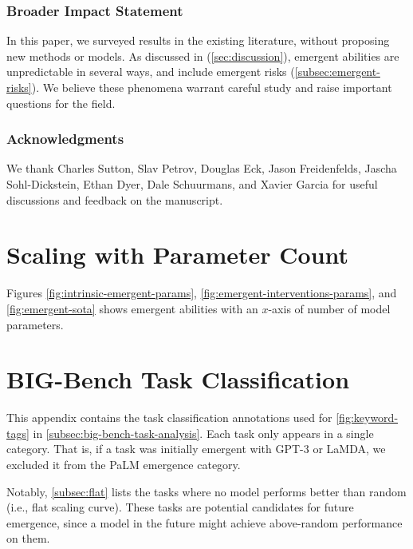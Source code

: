 \documentclass[10pt]{article} %
\begin{document}
\subsubsection*{Broader Impact Statement}
In this paper, we surveyed results in the existing literature, without proposing new methods or models. 
As discussed in (\cref{sec:discussion}), emergent abilities are unpredictable in several ways, and include emergent risks (\cref{subsec:emergent-risks}).
We believe these phenomena warrant careful study and raise important questions for the field.
 

\subsubsection*{Acknowledgments}
We thank Charles Sutton, Slav Petrov, Douglas Eck, Jason Freidenfelds, Jascha Sohl-Dickstein, Ethan Dyer, Dale Schuurmans, and Xavier Garcia for useful discussions and feedback on the manuscript.

\clearpage



\appendix





\clearpage
\section{Scaling with Parameter Count}\label{appendix:params}
Figures \ref{fig:intrinsic-emergent-params}, \ref{fig:emergent-interventions-params}, and \ref{fig:emergent-sota} shows emergent abilities with an $x$-axis of number of model parameters.




\clearpage
\section{BIG-Bench Task Classification}\label{sec:big-bench-annotations}

This appendix contains the task classification annotations used for \cref{fig:keyword-tags} in \cref{subsec:big-bench-task-analysis}.
Each task only appears in a single category.
That is, if a task was initially emergent with GPT-3 or LaMDA, we excluded it from the PaLM emergence category.

Notably, \cref{subsec:flat} lists the tasks where no model performs better than random (i.e., flat scaling curve). These tasks are potential candidates for future emergence, since a model in the future might achieve above-random performance on them.
\end{document}

